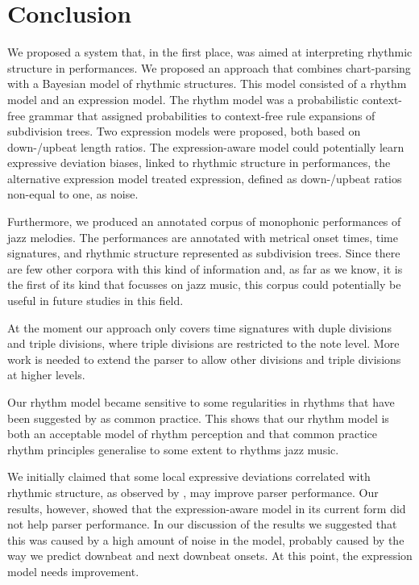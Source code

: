 \chapter{Conclusion}
\label{sec:conclusion}


We proposed a system that, in the first place, was aimed at interpreting rhythmic structure in performances. We proposed an approach that combines chart-parsing with a Bayesian model of rhythmic structures. This model consisted of a rhythm model and an expression model. The rhythm model was a probabilistic context-free grammar that assigned probabilities to context-free rule expansions of subdivision trees. Two expression models were proposed, both based on down-/upbeat length ratios. The expression-aware model could potentially learn expressive deviation biases, linked to rhythmic structure in performances, the alternative expression model treated expression, defined as down-/upbeat ratios non-equal to one, as noise.

Furthermore, we produced an annotated corpus of monophonic performances of jazz melodies. The performances are annotated with metrical onset times, time signatures, and rhythmic structure represented as subdivision trees. Since there are few other corpora with this kind of information and, as far as we know, it is the first of its kind that focusses on jazz music, this corpus could potentially be useful in future studies in this field. 

At the moment our approach only covers time signatures with duple divisions and triple divisions, where triple divisions are restricted to the note level. More work is needed to extend the parser to allow other divisions and triple divisions at higher levels.

Our rhythm model became sensitive to some regularities in rhythms that have been suggested by \citet{temperley2010modeling} as common practice. This shows that our rhythm model is both an acceptable model of rhythm perception and that common practice rhythm principles generalise to some extent to rhythms jazz music.

We initially claimed that some local expressive deviations correlated with rhythmic structure, as observed by \citet{bengtsson1983analysis}, may improve parser performance. Our results, however, showed that the expression-aware model in its current form did not help parser performance. In our discussion of the results we suggested that this was caused by a high amount of noise in the model, probably caused by the way we predict downbeat and next downbeat onsets. At this point, the expression model needs improvement.

